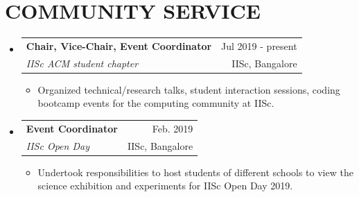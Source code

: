 \documentclass[letterpaper,11pt]{article}
\makeatletter
\newcommand{\resumeItem}[1]{
	\item\small{
		{#1 \vspace{-1pt}}
	}
}
\newcommand{\resumeSubheading}[4]{
	\vspace{-1pt}\item
	\begin{tabular*}{\textwidth}[t]{l@{\extracolsep{\fill}}r}
		\textbf{#1} & {\color{dark-grey}\small #2}\vspace{1pt}\\ %
		\textit{#3} & {\color{dark-grey} \small #4}\\ %
	\end{tabular*}\vspace{-4pt}
}
\newcommand{\resumeSubHeadingListStart}{\begin{itemize}[leftmargin=0in, label={}]}
\newcommand{\resumeSubHeadingListEnd}{\end{itemize}}
\newcommand{\resumeItemListStart}{\begin{itemize}}
\newcommand{\resumeItemListEnd}{\end{itemize}\vspace{0pt}}
\makeatother
\begin{document}
	\section{COMMUNITY SERVICE}
	\resumeSubHeadingListStart
	
	\resumeSubheading
	{Chair, Vice-Chair, Event Coordinator}{Jul 2019 - present}
	{IISc ACM student chapter}{IISc, Bangalore}
	\resumeItemListStart
	\resumeItem{ Organized technical/research talks, student interaction sessions, coding bootcamp events for the computing community at IISc.}	
	\resumeItemListEnd
	
	
	\resumeSubheading
	{Event Coordinator}{Feb. 2019}
	{IISc Open Day}{IISc, Bangalore}
	\resumeItemListStart
	\resumeItem{Undertook responsibilities to host students of different schools to view the science exhibition and experiments for IISc Open Day 2019.}	
	\resumeItemListEnd	
		
	\resumeSubHeadingListEnd
	

	
	
	
	
	
%	
	
	
	
\end{document}
